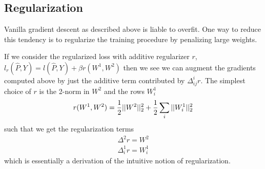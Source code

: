 \documentclass{article}
\begin{document}
\subsection{Regularization}
\label{sec:nn-regularization}

Vanilla gradient descent as described above is liable to overfit. One
way to reduce this tendency is to regularize the training procedure by
penalizing large weights.

If we consider the regularized loss with additive regularizer $r$,
$l_r(\hat{P}, Y) = l(\hat{P}, Y) + \beta r(W^1, W^2)$ then we see we
can augment the gradients computed above by just the additive term
contributed by $\Delta^i_{ij} r$. The simplest choice of $r$ is
the 2-norm in $W^2$ and the rows $W^1_i$
\begin{align}
  r(W^1, W^2) = \frac{1}{2}\vert\vert W^2 \vert\vert_{2}^2 + \frac{1}{2}\sum_i \vert\vert W^1_i \vert\vert_{2}^2
\end{align}
such that we get the regularization terms
\begin{align}
  \Delta^2 r = W^2 \\
  \Delta^1_i r = W^1_i
\end{align}
which is essentially a derivation of the intuitive notion of
regularization.
\end{document}
